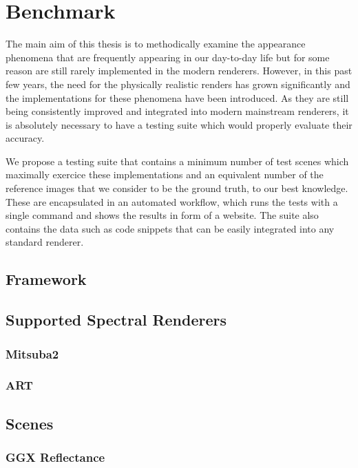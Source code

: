 \chapter{Benchmark}

The main aim of this thesis is to methodically examine the appearance phenomena that are frequently appearing in our day-to-day life but for some reason are still rarely implemented in the modern renderers. However, in this past few years, the need for the physically realistic renders has grown significantly and the implementations for these phenomena have been introduced. As they are still being consistently improved and integrated into modern mainstream renderers, it is absolutely necessary to have a testing suite which would properly evaluate their accuracy.

We propose a testing suite that contains a minimum number of test scenes which maximally exercice these implementations and an equivalent number of the reference images that we consider to be the ground truth, to our best knowledge. These are encapsulated in an automated workflow, which runs the tests with a single command and shows the results in form of a website. The suite also contains the data such as code snippets that can be easily integrated into any standard renderer.

\section{Framework}

\section{Supported Spectral Renderers}

\subsection{Mitsuba2}

\subsection{ART}

\section{Scenes}

\subsection{GGX Reflectance}

